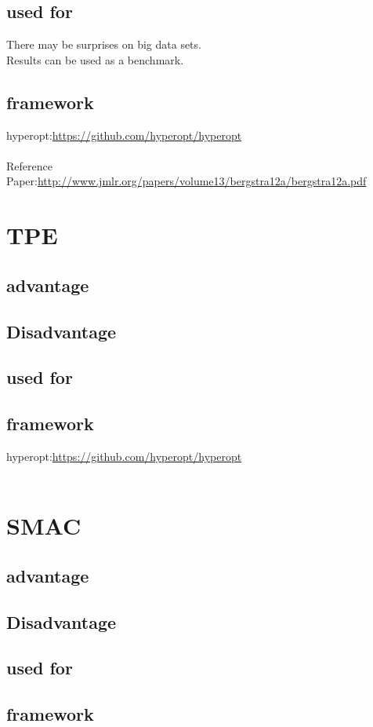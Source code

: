 \documentclass[12pt]{article}
\begin{document}
	\subsection{used for}
	There may be surprises on big data sets.\\
	Results can be used as a benchmark.
	
	\subsection{framework}
	
	hyperopt:\url{https://github.com/hyperopt/hyperopt}
	\\\\
	Reference Paper:\url{http://www.jmlr.org/papers/volume13/bergstra12a/bergstra12a.pdf} 

	\section{TPE}
	\subsection{advantage}

	\subsection{Disadvantage}

	\subsection{used for}

	\subsection{framework}
	hyperopt:\url{https://github.com/hyperopt/hyperopt}
	\\\\
	
	\section{SMAC}
	\subsection{advantage}

	\subsection{Disadvantage}

	\subsection{used for}

	\subsection{framework}

	
\end{document}
